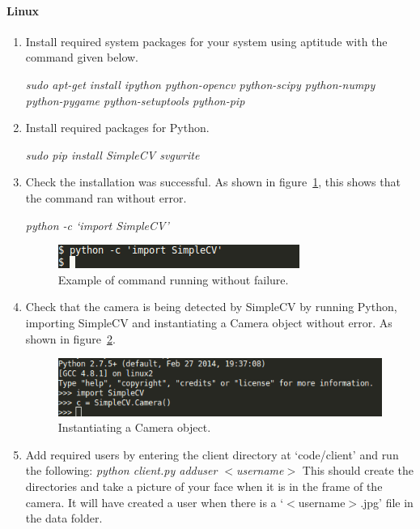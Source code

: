 \documentclass[a4paper]{article}
\begin{document}
        \paragraph{Linux}
        \begin{enumerate}
            \item Install required system packages for your system using aptitude with the command given below.

            \textit{sudo apt-get install ipython python-opencv python-scipy python-numpy python-pygame python-setuptools python-pip}

            \item Install required packages for Python.

            \textit{sudo pip install SimpleCV svgwrite}

            \item Check the installation was successful. As shown in figure~\ref{fig:simplecvcheck}, this shows that the command ran
            without error.

            \textit{python -c `import SimpleCV'}
            \begin{figure}[H]
                \centering
                \caption{Example of command running without failure.}
                \label{fig:simplecvcheck}
                    \includegraphics[scale=0.6]{../shared_assets/screenshots/manual/pychecksimplecv.png}
            \end{figure}

            \item Check that the camera is being detected by SimpleCV by running Python, importing SimpleCV and instantiating a 
            Camera object without error. As shown in figure~\ref{fig:cameracheck}.

            \begin{figure}[H]
                \centering
                \caption{Instantiating a Camera object.}
                \label{fig:cameracheck}
                    \includegraphics[scale=0.6]{../shared_assets/screenshots/manual/pycheckcamera.png}
            \end{figure}

            \item Add required users by entering the client directory at `code/client' and run the following: \newline
            \textit{python client.py adduser $<$username$>$} \newline
            This should create the directories and take a picture of your face when it is in the frame of the camera. It will have
            created a user when there is a `$<$username$>$.jpg' file in the data folder.

        \end{enumerate}
\end{document}

